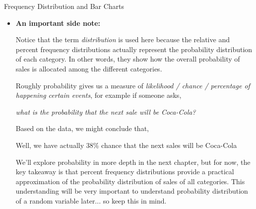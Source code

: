 \documentclass[8pt, usepdftitle=false]{beamer}
\begin{document}
\begin{frame}[allowframebreaks]{Frequency Distribution and Bar Charts}
\begin{itemize}
\framebreak

\item[] \textbf{An important side note:} 

\medskip

Notice that the term \emph{distribution} is used here because the relative and percent frequency distributions actually represent the \alert{probability distribution} of each category. In other words, they show how the overall probability of sales is allocated among the different categories.

\medskip

Roughly probability gives us a measure of \emph{likelihood / chance / percentage of happening certain events}, for example if someone asks, 

\medskip
\begin{center}
  \emph{what is the probability that the next sale will be Coca-Cola?}
\end{center}

\mnedskip


Based on the data, we might conclude that,


\mnedskip

\begin{center}
\alert{Well, we have actually 38\% chance that the next sales will be Coca-Cola}
\end{center}
\mnedskip


We’ll explore probability in more depth in the next chapter, but for now, the key takeaway is that percent frequency distributions provide a practical approximation of the probability distribution of sales of all categories. This understanding will be very important to understand probability distribution of a random variable later... so keep this in mind. 








\end{itemize}
\end{frame}
\end{document}
